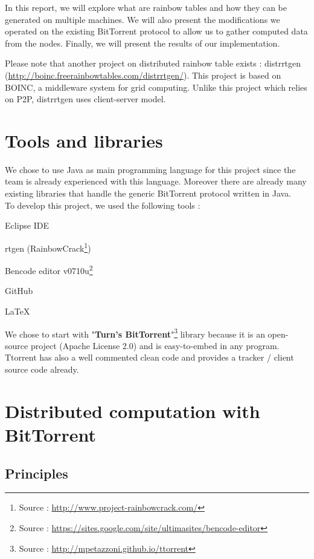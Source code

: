 \documentclass[a4paper]{article}
\begin{document}
{In this report, we will explore what are rainbow tables and how they can be generated on multiple machines. We will also present the modifications we operated on the existing BitTorrent protocol to allow us to gather computed data from the nodes. Finally, we will present the results of our implementation.

Please note that another project on distributed rainbow table exists : distrrtgen (\url{http://boinc.freerainbowtables.com/distrrtgen/}). This project is based on BOINC, a middleware system for grid computing. Unlike this project which relies on P2P, distrrtgen uses client-server model.

\section{Tools and libraries}

We chose to use Java as main programming language for this project since the team is already experienced with this language. Moreover there are already many existing libraries that handle the generic BitTorrent protocol written in Java.\\

To develop this project, we used the following tools :

\begin{listCustom}
	\item Eclipse IDE
	\item rtgen (RainbowCrack\footnote{Source : \url{http://www.project-rainbowcrack.com/}})
	\item Bencode editor v0710u\footnote{Source : \url{https://sites.google.com/site/ultimasites/bencode-editor}}
	\item GitHub
	\item LaTeX
\end{listCustom}

We chose to start with "\textbf{Turn's BitTorrent}"\footnote{Source : \url{http://mpetazzoni.github.io/ttorrent}} library because it is an open-source project (Apache License 2.0) and is easy-to-embed in any program. Ttorrent has also a well commented clean code and provides a tracker / client source code already.

\section{Distributed computation with BitTorrent}

\subsection{Principles}

}
\end{document}
